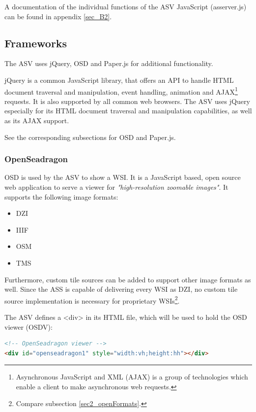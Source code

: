 A documentation of the individual functions of the ASV JavaScript (as{\textunderscore}server.js) can be found in appendix \ref{sec_B2}.

\subsection{Frameworks}
\label{sec4_asvFrameworks}
The ASV uses jQuery, OSD and Paper.js for additional functionality.

jQuery is a common JavaScript library, that offers an API to handle HTML document traversal and manipulation, event handling, animation and AJAX\footnote{
	Asynchronous JavaScript and XML (AJAX) is a group of technologies which enable a client to make asynchronous web requests\cite{Ullman07}.
} requests\cite{web:jquery}. It is also supported by all common web browsers\cite{web:jqueryBS}. The ASV uses jQuery especially for its HTML document traversal and manipulation capabilities, as well as its AJAX support.

See the corresponding subsections for OSD and Paper.js.

\subsubsection{OpenSeadragon}
OSD is used by the ASV to show a WSI. It is a JavaScript based, open source web application to serve a viewer for \emph{"high-resolution zoomable images"}\cite{web:openseadragon}. It supports the following image formats:

\begin{itemize}
	\item DZI
	\item IIIF
	\item OSM
	\item TMS
\end{itemize}

Furthermore, custom tile sources can be added to support other image formats as well. Since the ASS is capable of delivering every WSI as DZI, no custom tile source implementation is necessary for proprietary WSIs\footnote{
	Compare subsection \ref{sec2_openFormats}.
}.

The ASV defines a \textless{div}{\textgreater} in its HTML file, which will be used to hold the OSD viewer (OSDV):
\begin{lstlisting}[title=as{\textunderscore}viewer.html, frame=single, language=html]
<!-- OpenSeadragon viewer -->
<div id="openseadragon1" style="width:vh;height:hh"></div>
\end{lstlisting}

